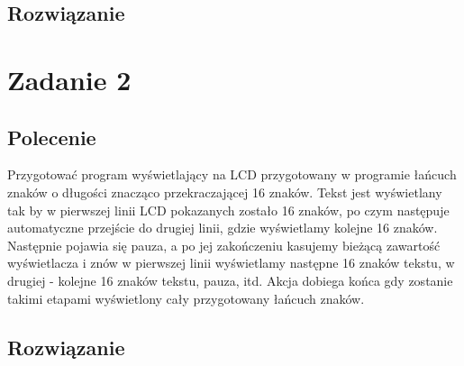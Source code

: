 \documentclass[a4paper,12pt]{extarticle}  %
\begin{document}
\subsection{Rozwiązanie}

\section{Zadanie 2}
\subsection{Polecenie}
Przygotować program wyświetlający na LCD przygotowany w programie łańcuch znaków o długości
znacząco przekraczającej 16 znaków. Tekst jest wyświetlany tak by w pierwszej linii LCD pokazanych zostało
16 znaków, po czym następuje automatyczne przejście do drugiej linii, gdzie wyświetlamy kolejne 16 znaków.
Następnie pojawia się pauza, a po jej zakończeniu kasujemy bieżącą zawartość wyświetlacza i znów w pierwszej
linii wyświetlamy następne 16 znaków tekstu, w drugiej - kolejne 16 znaków tekstu, pauza, itd.
Akcja dobiega końca gdy zostanie takimi etapami wyświetlony cały przygotowany łańcuch znaków.
\subsection{Rozwiązanie}

\end{document}
